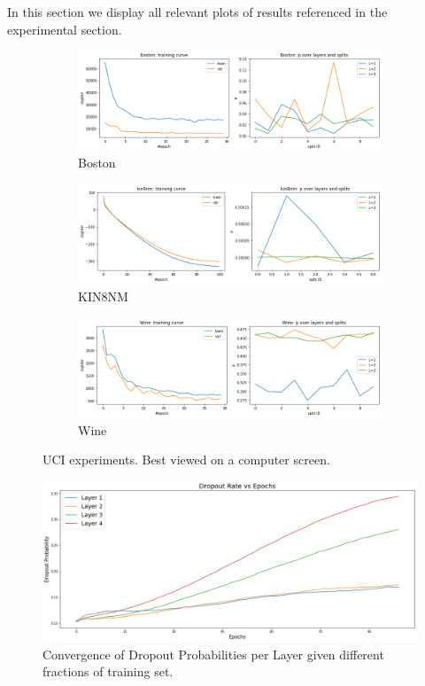 \documentclass{article}
\begin{document}
In this section we display all relevant plots of results referenced in the experimental section.
\begin{figure}[!h]
\centering
\begin{subfigure}{.33\textwidth}
  \centering
  \includegraphics[width=\linewidth]{boston.png}
  \caption{Boston}
\end{subfigure}%
\begin{subfigure}{.33\textwidth}
  \centering
  \includegraphics[width=\linewidth]{kin8nm.png}
  \caption{KIN8NM}
\end{subfigure}%
\begin{subfigure}{.33\textwidth}
  \centering
  \includegraphics[width=\linewidth]{wine.png}
  \caption{Wine}
\end{subfigure}
\caption{UCI experiments. Best viewed on a computer screen.}
\label{fig:uci}
\end{figure}


\begin{figure}[!h]
\centering
\centering
\includegraphics[width=0.5\linewidth]{dropout_convergence_100.png}
\caption{Convergence of Dropout Probabilities per Layer given different fractions of training set.}
\label{fig:mnist_frac}
\end{figure}
\end{document}
